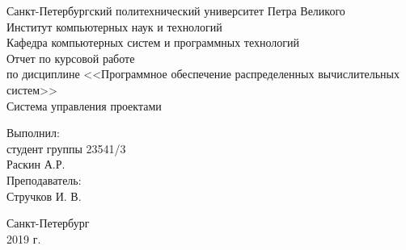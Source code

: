 	\begin{titlepage}
		\begin{center}
			Санкт-Петербургский политехнический	университет Петра Великого\\
			Институт компьютерных наук и технологий\\
			Кафедра компьютерных систем и программных технологий\\
			\vspace{6cm}
			Отчет по курсовой работе\\
			по дисциплине <<Программное обеспечение распределенных вычислительных систем>>\\
			\Large
			Система управления проектами\\
			\small
		\end{center}
		\vspace{3cm}
		\begin{flushright}
			Выполнил:\\
			студент группы 23541/3\\
			Раскин А.Р.\\
			\vspace{1cm}			
			Преподаватель:\\
			Стручков И. В.\\
		\end{flushright}
		\vspace{4cm}
		\begin{center}
			Санкт-Петербург\\
			2019 г.\\
		\end{center}
	\end{titlepage}
	\newpage